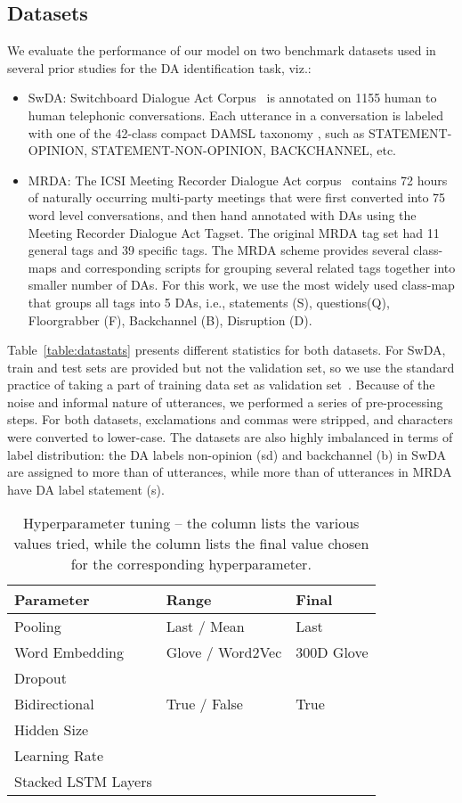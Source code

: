 \documentclass[letterpaper]{article} \usepackage{aaai18}
\begin{document}
\subsection{Datasets}
We evaluate the performance of our model on two benchmark datasets used in several prior studies for the DA identification task, viz.:
\begin{itemize}
  \item SwDA: Switchboard Dialogue Act Corpus~\cite{Jurafsky1997} is annotated on 1155 human to human telephonic conversations. Each utterance in a conversation is labeled with one of the 42-class compact DAMSL taxonomy \cite{Core1997}, such as STATEMENT-OPINION, STATEMENT-NON-OPINION, BACKCHANNEL, etc. 
  \item MRDA: The ICSI Meeting Recorder Dialogue Act corpus~\cite{Janin2003,Ang2005} contains 72 hours of naturally occurring multi-party meetings that were first converted into 75 word level conversations, and then hand annotated with DAs using the Meeting Recorder Dialogue Act Tagset. The original MRDA tag set had 11 general tags and 39 specific tags. The MRDA scheme provides several class-maps and corresponding scripts for grouping several related tags together into smaller number of DAs. For this work, we use the most widely used class-map that groups all tags into 5 DAs, i.e., statements (S), questions(Q), Floorgrabber (F), Backchannel (B), Disruption (D).  
\end{itemize} 
Table~\ref{table:datastats} presents different statistics for both datasets. For SwDA, train and test sets are provided but not the validation set, so we use the standard practice of taking a part of training data set as validation set~\cite{Lee2016}. Because of the noise and informal nature of utterances, we performed a series of pre-processing steps. For both datasets, exclamations and commas were stripped, and characters were converted to lower-case. The datasets are also highly imbalanced in terms of label distribution: the DA labels non-opinion (sd) and backchannel (b) in SwDA are assigned to more than  of utterances, while more than  of utterances in MRDA have DA label statement (s).
\begin{table}[!htb]
  \center
  \small
  \begin{tabular}{| l | l | l | }
    \hline
    \textbf{Parameter} 		& \textbf{Range}	& \textbf{Final}	\\
    \hline
    Pooling 				& Last / Mean 		& Last				\\
    Word Embedding 			& Glove / Word2Vec	& 300D Glove 		\\
    Dropout 				&  			&  			\\
    Bidirectional 			& True / False 		& True 				\\
    Hidden Size				&  			&  			\\
    Learning Rate 			&  			& 				\\
    Stacked LSTM Layers		&  			&  				\\
    \hline
  \end{tabular}
  \caption{Hyperparameter tuning -- the  column lists the various values tried, while the  column lists the final value chosen for the corresponding hyperparameter.}
  \label{table:parameter}
\end{table}
\end{document}
